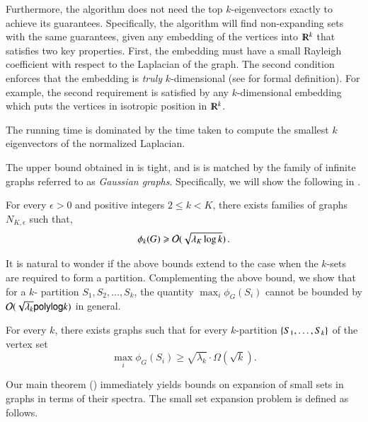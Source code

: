 \documentclass[11pt]{article}
\begin{document}
%
Furthermore, the algorithm does not need the top $k$-eigenvectors exactly to achieve its guarantees.  Specifically, the algorithm will find non-expanding sets with the same guarantees, given any embedding of the vertices into $\R^k$ that satisfies two key properties.  First, the embedding must have a small Rayleigh coefficient with respect to the Laplacian of the graph.  The second condition enforces that the embedding is {\it truly} $k$-dimensional (see  for formal definition).  For example, the second requirement is satisfied by any $k$-dimensional embedding which puts the vertices in isotropic position in $\R^k$.  

The running time is dominated by the time taken to compute the smallest $k$ eigenvectors of the normalized Laplacian.


The upper bound obtained in  is tight, and is  
is matched by the family of infinite graphs referred to as {\em
Gaussian graphs}. 
Specifically, we will show the following in
.

\begin{theorem}	\label{thm:bound-k-sets}
	For every $\epsilon > 0$ and positive integers $2 \leq k < K$, there exists families of graphs
	$N_{K,\epsilon}$ such that,
	$$ \phi_k(G) \geqslant \mathcal O(\sqrt{\lambda_K \log k}) \,. $$ 
\end{theorem}
%
It is natural to wonder if the above bounds extend to the case when
the $k$-sets are required to form a partition.  
Complementing the above bound, we show that for a $k$- partition
$S_1,S_2,\ldots,S_k$, the quantity $\max_i \phi_G(S_i)$ cannot be
bounded by $\mathcal{O}(\sqrt{\lambda_k} {\sf polylog} k)$ in general. 
%

\begin{theorem}
\label{thm:partition}
For every $k$, there exists graphs such that for every $k$-partition $\left\{S_1, \ldots, S_k\right\}$ of the vertex set
\[
\max_i \phi_G(S_i) \geq  \sqrt{\lambda_k} \cdot \Omega(\sqrt{k}).
\]
\end{theorem}
%
%
Our main theorem () immediately yields bounds on
expansion of small sets in graphs in terms of their spectra.  The
small set expansion problem is defined as follows.
\end{document}
